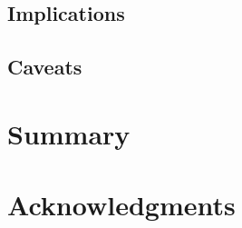 \documentclass[useAMS,usenatbib]{mn2e}
\begin{document}
\subsection{Implications}
\subsection{Caveats}

% 
\section{Summary}

% 
\section*{Acknowledgments}

%
\end{document}
